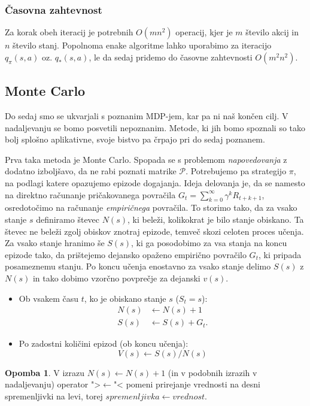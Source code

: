 \documentclass[12pt,a4paper]{amsart}
\theoremstyle{definition} %
\newtheorem{opomba}[definicija]{Opomba}
\theoremstyle{plain} %
\begin{document}
\subsubsection{Časovna zahtevnost}
Za korak obeh iteracij je potrebnih $O(mn^2)$ operacij, kjer je $m$ število akcij in $n$ število 
stanj. Popolnoma enake algoritme lahko uporabimo za iteracijo $q_\pi(s, a)$ oz. $q_*(s, a)$, le 
da sedaj pridemo do časovne zahtevnosti $O(m^2n^2)$.

\subsection{Monte Carlo}
Do sedaj smo se ukvarjali s poznanim MDP-jem, kar pa ni naš končen cilj. V nadaljevanju se bomo 
posvetili nepoznanim. Metode, ki jih bomo spoznali so tako bolj splošno aplikativne, svoje 
bistvo pa črpajo pri do sedaj poznanem.

Prva taka metoda je Monte Carlo. Spopada se s problemom \textit{napovedovanja} z dodatno izboljšavo, 
da ne rabi poznati matrike $\mathcal{P}$. Potrebujemo pa strategijo $\pi$, na podlagi katere opazujemo
epizode dogajanja. Ideja delovanja je, da se namesto na direktno računanje pričakovanega povračila
$G_t = \sum_{k=0}^\infty \gamma^k R_{t + k + 1}$, osredotočimo na računanje \textit{empiričnega} 
povračila. To storimo tako, da za vsako stanje $s$ definiramo števec $N(s)$, ki beleži, kolikokrat 
je bilo stanje obiskano. Ta števec ne beleži zgolj obiskov znotraj epizode, temveč skozi celoten 
proces učenja. Za vsako stanje hranimo še $S(s)$, ki ga posodobimo za vsa stanja na koncu epizode
tako, da prištejemo dejansko opaženo empirično povračilo $G_t$, ki pripada posameznemu stanju.
Po koncu učenja enostavno za vsako stanje delimo $S(s)$ z $N(s)$ in tako dobimo vzorčno povprečje za 
dejanski $v(s)$.
\begin{itemize}
    \item Ob vsakem času $t$, ko je obiskano stanje $s$ ($S_t = s$): 
        \begin{align*}
            N(s) &\leftarrow N(s) + 1 \\
            S(s) &\leftarrow S(s) + G_t.
        \end{align*}
    \item Po zadostni količini epizod (ob koncu učenja): 
        $$
        V(s) \leftarrow S(s) / N(s)
        $$
\end{itemize}

\begin{opomba}
    V izrazu $N(s) \leftarrow N(s) + 1$ (in v podobnih izrazih v nadaljevanju) operator ">$\leftarrow$"<
    pomeni prirejanje vrednosti na desni spremenljivki na levi, torej $spremenljivka \leftarrow vrednost$.
\end{opomba}
\end{document}
